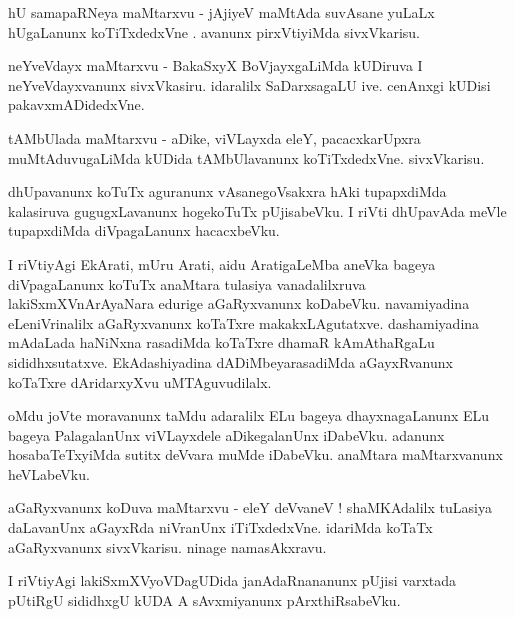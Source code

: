 \documentclass{article}
\begin{document}
\begin{mn}%
hU samapaRNeya maMtarxvu - jAjiyeV maMtAda suvAsane yuLaLx hUgaLanunx koTiTxdedxVne . avanunx pirxVtiyiMda sivxVkarisu.
\end{mn}

\begin{mn}%
neYveVdayx maMtarxvu - BakaSxyX  BoVjayxgaLiMda kUDiruva I neYveVdayxvanunx sivxVkasiru. idaralilx SaDarxsagaLU ive. 
cenAnxgi kUDisi pakavxmADidedxVne.
\end{mn}

\begin{mn}%
tAMbUlada maMtarxvu - aDike, viVLayxda eleY, pacacxkarUpxra muMtAduvugaLiMda kUDida tAMbUlavanunx koTiTxdedxVne. 
sivxVkarisu.
\end{mn}

\begin{mn}%
dhUpavanunx koTuTx aguranunx vAsanegoVsakxra hAki tupapxdiMda kalasiruva gugugxLavanunx hogekoTuTx pUjisabeVku. I 
riVti dhUpavAda meVle tupapxdiMda diVpagaLanunx hacacxbeVku.
\end{mn}

\begin{mn}%
I riVtiyAgi EkArati, mUru Arati, aidu AratigaLeMba aneVka bageya diVpagaLanunx koTuTx anaMtara tulasiya vanadalilxruva
lakiSxmXVnArAyaNara edurige aGaRyxvanunx koDabeVku. navamiyadina eLeniVrinalilx aGaRyxvanunx koTaTxre 
makakxLAgutatxve. dashamiyadina mAdaLada haNiNxna rasadiMda koTaTxre dhamaR kAmAthaRgaLu sididhxsutatxve. 
EkAdashiyadina dADiMbeyarasadiMda aGayxRvanunx koTaTxre dAridarxyXvu uMTAguvudilalx.
\end{mn}

\begin{mn}%
oMdu joVte moravanunx taMdu adaralilx ELu bageya dhayxnagaLanunx ELu bageya PalagalanUnx viVLayxdele aDikegalanUnx 
iDabeVku. adanunx hosabaTeTxyiMda sutitx deVvara muMde iDabeVku. anaMtara maMtarxvanunx heVLabeVku.
\end{mn}

\begin{mn}%
aGaRyxvanunx koDuva maMtarxvu - eleY deVvaneV ! shaMKAdalilx tuLasiya daLavanUnx aGayxRda niVranUnx iTiTxdedxVne. 
idariMda koTaTx aGaRyxvanunx sivxVkarisu. ninage namasAkxravu.
\end{mn}

\begin{mn}%
I riVtiyAgi lakiSxmXVyoVDagUDida janAdaRnananunx pUjisi varxtada pUtiRgU sididhxgU kUDA A sAvxmiyanunx pArxthiRsabeVku.
\end{mn}
\end{document}
